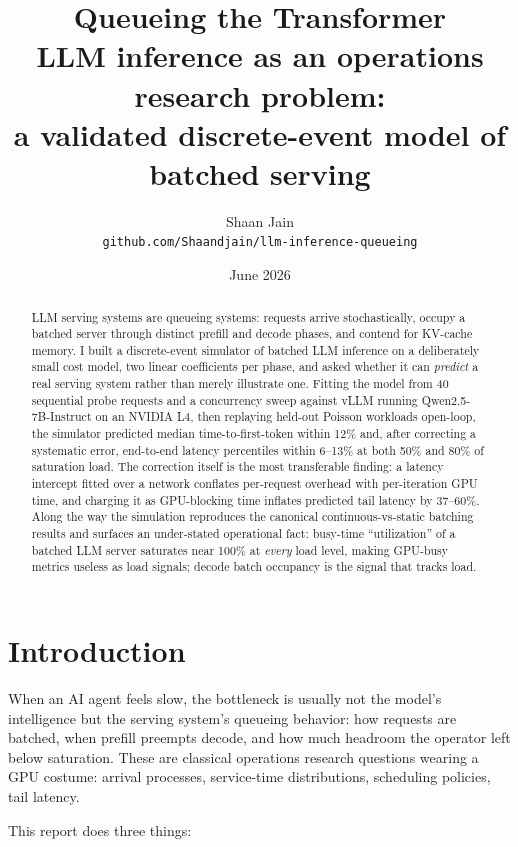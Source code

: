 \documentclass[11pt]{article}
\title{\textbf{Queueing the Transformer}\\[4pt]
\large LLM inference as an operations research problem:\\
a validated discrete-event model of batched serving}
\author{Shaan Jain\\ \small\texttt{github.com/Shaandjain/llm-inference-queueing}}
\date{June 2026}
\begin{document}
\maketitle

\begin{abstract}
\noindent
LLM serving systems are queueing systems: requests arrive stochastically, occupy a batched server through distinct prefill and decode phases, and contend for KV-cache memory. I built a discrete-event simulator of batched LLM inference on a deliberately small cost model, two linear coefficients per phase, and asked whether it can \emph{predict} a real serving system rather than merely illustrate one. Fitting the model from 40 sequential probe requests and a concurrency sweep against vLLM running Qwen2.5-7B-Instruct on an NVIDIA L4, then replaying held-out Poisson workloads open-loop, the simulator predicted median time-to-first-token within 12\% and, after correcting a systematic error, end-to-end latency percentiles within 6--13\% at both 50\% and 80\% of saturation load. The correction itself is the most transferable finding: a latency intercept fitted over a network conflates per-request overhead with per-iteration GPU time, and charging it as GPU-blocking time inflates predicted tail latency by 37--60\%. Along the way the simulation reproduces the canonical continuous-vs-static batching results and surfaces an under-stated operational fact: busy-time ``utilization'' of a batched LLM server saturates near 100\% at \emph{every} load level, making GPU-busy metrics useless as load signals; decode batch occupancy is the signal that tracks load.
\end{abstract}

\section{Introduction}

When an AI agent feels slow, the bottleneck is usually not the model's intelligence but the serving system's queueing behavior: how requests are batched, when prefill preempts decode, and how much headroom the operator left below saturation. These are classical operations research questions wearing a GPU costume: arrival processes, service-time distributions, scheduling policies, tail latency.

This report does three things:
\end{document}
